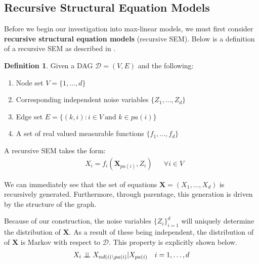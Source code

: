 \documentclass[12pt]{article}
\newcommand{\indep}{\perp \hspace{-.5 em} \perp}
\newcommand{\ds}{\displaystyle}
\theoremstyle{definition}
\theoremstyle{definition}
\newtheorem{definition}{Definition}
\begin{document}
\subsection{Recursive Structural Equation Models}
Before we begin our investigation into max-linear models, we must first consider \textbf{recursive structural equation models} (recursive SEM). Below is a definition of a recursive SEM as described in \cite{mlmodels}.
\begin{definition} Given a DAG $\mathcal{D}=(V,E)$ and the following:
\begin{enumerate}
    \item Node set $V=\{1,\hdots, d\}$
    \item Corresponding independent noise variables $\{Z_1,\hdots, Z_d\}$
    \item Edge set $E=\{(k,i):i \in V \ \text{and } k \in pa(i)\}$
    \item A set of real valued measurable functions $\{f_1, \hdots, f_d\}$
\end{enumerate}
A recursive SEM takes the form:
\begin{align*}
    &X_i=f_i(\mathbf{X}_{pa(i)},Z_i) && \forall i \in V
\end{align*}
\end{definition}
We can immediately see that the set of equations $\mathbf{X}= (X_1, \hdots, X_d)$ is recursively generated. Furthermore, through parentage, this generation is driven by the structure of the graph.

Because of our construction, the noise variables $\ds\{Z_i\}_{i=1}^d$ will uniquely determine the distribution of $\mathbf{X}$. As a result of these being independent, the distribution of of $\mathbf{X}$ is Markov with respect to $\mathcal{D}$. This property is explicitly shown below.
\begin{align*}
X_i \indep X_{nd(i)\setminus pa(i)}|X_{pa(i)} &&i=1,\hdots, d
\end{align*}
\newpage
\end{document}
